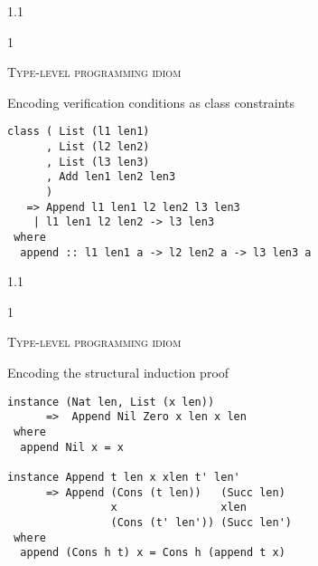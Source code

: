 \documentclass{slides}
\newcommand{\header}[1]{{\large\scshape \color{Red} #1} \medskip }
\newcommand{\blau}[1]{{\color{Blue} #1} \medskip }
\newenvironment{myslide}{\begin{slide}\color{Blue}\begin{boxedminipage}{1.1\hsize}\begin{boxedminipage}{1\hsize}\color{Black}
\vspace{-170\in}
}{%
\smallskip
\end{boxedminipage}
\end{boxedminipage}
\end{slide}}
\begin{document}



\begin{myslide}

\header{Type-level programming idiom}

\blau{Encoding verification conditions as class constraints}

\medskip

\begin{Verbatim}[fontseries=normal,fontsize=\tiny]
class ( List (l1 len1)
      , List (l2 len2)
      , List (l3 len3)
      , Add len1 len2 len3
      )
   => Append l1 len1 l2 len2 l3 len3
    | l1 len1 l2 len2 -> l3 len3
 where
  append :: l1 len1 a -> l2 len2 a -> l3 len3 a
\end{Verbatim}

\end{myslide}






\begin{myslide}

\header{Type-level programming idiom}

\blau{Encoding the structural induction proof}

\begin{Verbatim}[fontseries=normal,fontsize=\tiny]
instance (Nat len, List (x len))
      =>  Append Nil Zero x len x len
 where   
  append Nil x = x

instance Append t len x xlen t' len'
      => Append (Cons (t len))   (Succ len)
                x                xlen
                (Cons (t' len')) (Succ len')
 where
  append (Cons h t) x = Cons h (append t x)
\end{Verbatim}

\end{myslide}



\end{document}
